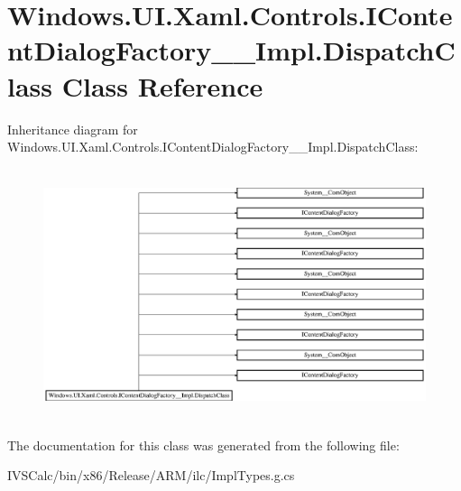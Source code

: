 \hypertarget{class_windows_1_1_u_i_1_1_xaml_1_1_controls_1_1_i_content_dialog_factory_____impl_1_1_dispatch_class}{}\section{Windows.\+U\+I.\+Xaml.\+Controls.\+I\+Content\+Dialog\+Factory\+\_\+\+\_\+\+Impl.\+Dispatch\+Class Class Reference}
\label{class_windows_1_1_u_i_1_1_xaml_1_1_controls_1_1_i_content_dialog_factory_____impl_1_1_dispatch_class}
Inheritance diagram for Windows.\+U\+I.\+Xaml.\+Controls.\+I\+Content\+Dialog\+Factory\+\_\+\+\_\+\+Impl.\+Dispatch\+Class\+:\begin{figure}[H]
\begin{center}
\leavevmode
\includegraphics[height=7.368422cm]{class_windows_1_1_u_i_1_1_xaml_1_1_controls_1_1_i_content_dialog_factory_____impl_1_1_dispatch_class}
\end{center}
\end{figure}


The documentation for this class was generated from the following file\+:\begin{DoxyCompactItemize}
\item 
I\+V\+S\+Calc/bin/x86/\+Release/\+A\+R\+M/ilc/Impl\+Types.\+g.\+cs\end{DoxyCompactItemize}
